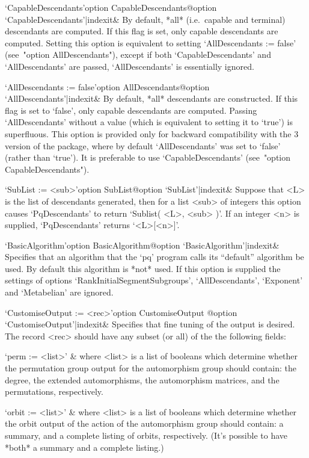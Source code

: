 \>`CapableDescendants'{option CapableDescendants}@{option `CapableDescendants'|indexit}&
By default, *all* (i.e.~capable and terminal) descendants  are  computed.
If this flag is set, only capable descendants are computed. Setting  this
option is equivalent to setting `AllDescendants  :=  false'  (see~"option
AllDescendants"),    except    if    both    `CapableDescendants'     and
`AllDescendants' are passed, `AllDescendants' is essentially ignored.

\>`AllDescendants := false'{option AllDescendants}@{option `AllDescendants'|indexit}&
By default, *all* descendants are constructed. If this  flag  is  set  to
`false', only capable descendants are computed. Passing  `AllDescendants'
without a value  (which  is  equivalent  to  setting  it  to  `true')  is
superfluous. This option is provided only for backward compatibility with
the  {\GAP}  3  version  of  the  {\ANUPQ}  package,  where  by   default
`AllDescendants'  was  set  to  `false'  (rather  than  `true').  It   is
preferable to use `CapableDescendants' (see~"option CapableDescendants").

\>`SubList := <sub>'{option SubList}@{option `SubList'|indexit}&
Suppose that <L> is the list of descendants generated, then  for  a  list
<sub> of integers this option causes `PqDescendants' to return  `Sublist(
<L>, <sub> )'. If an integer <n>  is  supplied,  `PqDescendants'  returns
`<L>[<n>]'.

\>`BasicAlgorithm'{option BasicAlgorithm}@{option `BasicAlgorithm'|indexit}&
Specifies that an algorithm that the `pq' program  calls  its  ``default''
algorithm be used. By default this  algorithm  is  *not*  used.  If  this
option is supplied the settings of options `RankInitialSegmentSubgroups',
`AllDescendants', `Exponent' and `Metabelian' are ignored.

\>`CustomiseOutput := <rec>'{option CustomiseOutput}%
@{option `CustomiseOutput'|indexit}&
Specifies that fine tuning of the output is  desired.  The  record  <rec>
should have any subset (or all) of the the following fields:

\quad`perm := <list>' &
where  <list>  is  a  list  of  booleans  which  determine  whether   the
permutation group output for the automorphism group should  contain:  the
degree, the extended automorphisms, the automorphism  matrices,  and  the
permutations, respectively.

\quad`orbit := <list>' &
where <list> is a list of booleans  which  determine  whether  the  orbit
output of the action of the automorphism group should contain: a summary,
and a complete listing of orbits, respectively. (It's  possible  to  have
*both* a summary and a complete listing.)

